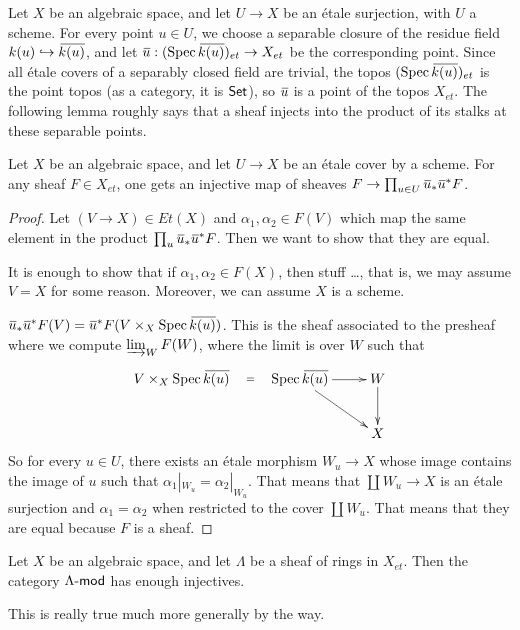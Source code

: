  Let $X$ be an algebraic space, and let $U\to X$ be an \'etale surjection, with $U$ a
 scheme. For every point $u\in U$, we choose a separable closure of the residue field
 $k(u)\hookrightarrow \bbar{k(u)}$, and let $\bbar u:(\spec \bbar{k(u)})_{et}\to X_{et}$
 be the corresponding point. Since all \'etale covers of a separably closed field are
 trivial, the topos $(\spec \bbar{k(u)})_{et}$ is the point topos (as a category, it is
 $\set$), so $\bbar u$ is a point of the topos $X_{et}$. The following lemma roughly says
 that a sheaf injects into the product of its stalks at these separable points.
 \begin{lemma}\label{lec18L:enough_points}
   Let $X$ be an algebraic space, and let $U\to X$ be an \'etale cover by a scheme. For
   any sheaf $F\in X_{et}$, one gets an injective map of sheaves $F\to \prod_{u\in U}
   \bbar u_* \bbar u^* F$.
 \end{lemma}
 \begin{proof}
   Let $(V\to X)\in Et(X)$ and $\alpha_1,\alpha_2 \in F(V)$ which map the same element
   in the product $\prod_u \bbar u_* \bbar u^* F$. Then we want to show that they are
   equal.

   It is enough to show that if $\alpha_1,\alpha_2\in F(X)$, then stuff \dots, that is,
   we may assume $V=X$ for some reason. Moreover, we can assume $X$ is a
   scheme.

   {$\bbar u_* \bbar u^* F(V) = \bbar u^* F(V\times_X \spec \bbar{k(u)})$. This
   is the sheaf associated to the presheaf where we compute $\varinjlim_{W} F(W)$,
   where the limit is over $W$ such that
   \[\xymatrix{
   V\times_X \spec \bbar{k(u)} \ar@{}[r]|<>(.5){=} & \spec \bbar{k(u)} \ar[r] \ar[dr] & W\ar[d]\\
   & & X
   }\]}
   So for every $u\in U$, there exists an \'etale morphism $W_u\to X$ whose image
   contains the image of $u$ such that $\alpha_1|_{W_u}=\alpha_2|_{W_u}$. That means
   that $\coprod W_u\to X$ is an \'etale surjection and $\alpha_1=\alpha_2$ when
   restricted to the cover $\coprod W_u$. That means that they are equal because $F$ is
   a sheaf.
 \end{proof}
 \begin{lemma}\label{lec18L:enough_injectives_among_modules}
   Let $X$ be an algebraic space, and let $\Lambda$ be a sheaf of rings in $X_{et}$. Then
   the category $\Lambda\mod$ has enough injectives.
 \end{lemma}
 This is really true much more generally by the way.
